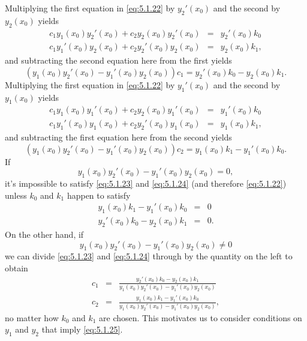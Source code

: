 \documentclass{ximera}
\begin{document}
Multiplying the first equation in \eqref{eq:5.1.22} by $y_2'(x_0)$
and the second by $y_2(x_0)$ yields
\begin{eqnarray*}
c_1y_1(x_0)y_2'(x_0)+c_2y_2(x_0)y_2'(x_0)&=& y_2'(x_0)k_0\\
c_1y_1'(x_0)y_2(x_0)+c_2y_2'(x_0)y_2(x_0)&=& y_2(x_0)k_1,
\end{eqnarray*}
and subtracting the second equation here from the first yields
\begin{equation}\label{eq:5.1.23}
\left(y_1(x_0)y_2'(x_0)-y_1'(x_0)y_2(x_0)\right)c_1=
y_2'(x_0)k_0-y_2(x_0)k_1.
\end{equation}
Multiplying the first equation in \eqref{eq:5.1.22} by $y_1'(x_0)$
and the second by $y_1(x_0)$ yields
\begin{eqnarray*}
c_1y_1(x_0)y_1'(x_0)+c_2y_2(x_0)y_1'(x_0)&=& y_1'(x_0)k_0\\
c_1y_1'(x_0)y_1(x_0)+c_2y_2'(x_0)y_1(x_0)&=& y_1(x_0)k_1,
\end{eqnarray*}
and subtracting the first equation here from the second yields
\begin{equation}\label{eq:5.1.24}
\left(y_1(x_0)y_2'(x_0)-y_1'(x_0)y_2(x_0)\right)c_2=
y_1(x_0)k_1-y_1'(x_0)k_0.
\end{equation}
If
$$
y_1(x_0)y_2'(x_0)-y_1'(x_0)y_2(x_0)=0,
$$
 it's impossible to satisfy \eqref{eq:5.1.23} and \eqref{eq:5.1.24}
(and therefore \eqref{eq:5.1.22})
unless $k_0$ and $k_1$ happen to satisfy
\begin{eqnarray*}
y_1(x_0)k_1-y_1'(x_0)k_0&=&0\\
y_2'(x_0)k_0-y_2(x_0)k_1&=&0.
\end{eqnarray*}
On the other hand, if
\begin{equation}\label{eq:5.1.25}
y_1(x_0)y_2'(x_0)-y_1'(x_0)y_2(x_0)\ne0
\end{equation}
 we can  divide \eqref{eq:5.1.23} and \eqref{eq:5.1.24} through by the
quantity on the left  to obtain
\begin{equation}\label{eq:5.1.26}
\begin{array}{rcl}
c_1&=&\frac{y_2'(x_0)k_0-y_2(x_0)k_1}
{y_1(x_0)y_2'(x_0)-y_1'(x_0)y_2(x_0)}\\
c_2&=&\frac{y_1(x_0)k_1-y_1'(x_0)k_0}
{y_1(x_0)y_2'(x_0)-y_1'(x_0)y_2(x_0)},
\end{array}
\end{equation}
no matter how $k_0$ and $k_1$ are chosen. This motivates us to
consider conditions on $y_1$ and $y_2$ that imply \eqref{eq:5.1.25}.
 
\end{document}
